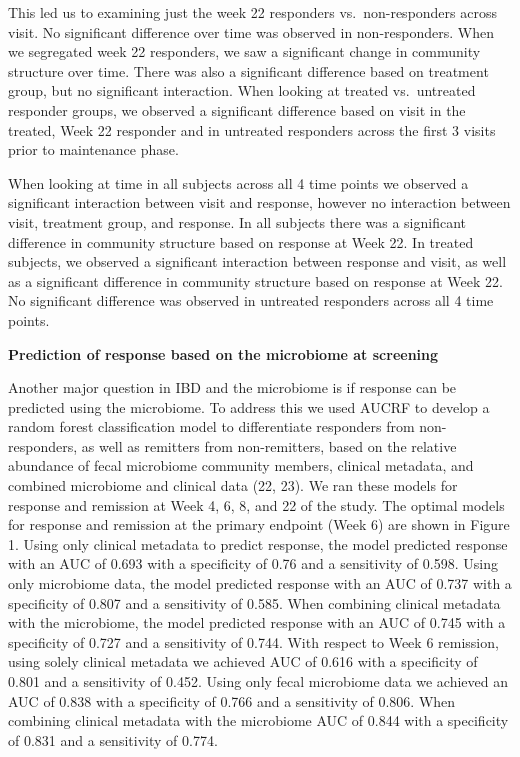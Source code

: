 \documentclass[11pt,]{article}
\begin{document}
This led us to examining just the week 22 responders vs.~non-responders
across visit. No significant difference over time was observed in
non-responders. When we segregated week 22 responders, we saw a
significant change in community structure over time. There was also a
significant difference based on treatment group, but no significant
interaction. When looking at treated vs.~untreated responder groups, we
observed a significant difference based on visit in the treated, Week 22
responder and in untreated responders across the first 3 visits prior to
maintenance phase.

When looking at time in all subjects across all 4 time points we
observed a significant interaction between visit and response, however
no interaction between visit, treatment group, and response. In all
subjects there was a significant difference in community structure based
on response at Week 22. In treated subjects, we observed a significant
interaction between response and visit, as well as a significant
difference in community structure based on response at Week 22. No
significant difference was observed in untreated responders across all 4
time points.

\textbf{Prediction of response based on the microbiome at screening}

Another major question in IBD and the microbiome is if response can be
predicted using the microbiome. To address this we used AUCRF to develop
a random forest classification model to differentiate responders from
non-responders, as well as remitters from non-remitters, based on the
relative abundance of fecal microbiome community members, clinical
metadata, and combined microbiome and clinical data (22, 23). We ran
these models for response and remission at Week 4, 6, 8, and 22 of the
study. The optimal models for response and remission at the primary
endpoint (Week 6) are shown in Figure 1. Using only clinical metadata to
predict response, the model predicted response with an AUC of 0.693 with
a specificity of 0.76 and a sensitivity of 0.598. Using only microbiome
data, the model predicted response with an AUC of 0.737 with a
specificity of 0.807 and a sensitivity of 0.585. When combining clinical
metadata with the microbiome, the model predicted response with an AUC
of 0.745 with a specificity of 0.727 and a sensitivity of 0.744. With
respect to Week 6 remission, using solely clinical metadata we achieved
AUC of 0.616 with a specificity of 0.801 and a sensitivity of 0.452.
Using only fecal microbiome data we achieved an AUC of 0.838 with a
specificity of 0.766 and a sensitivity of 0.806. When combining clinical
metadata with the microbiome AUC of 0.844 with a specificity of 0.831
and a sensitivity of 0.774.
\end{document}

